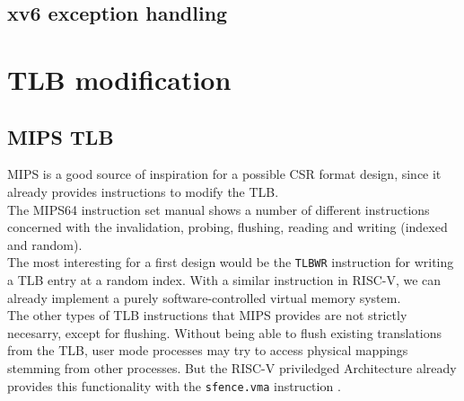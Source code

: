 \subsection{xv6 exception handling}

%
\section{TLB modification}

\subsection{MIPS TLB} %

MIPS is a good source of inspiration for a possible CSR format design, since it already provides
instructions to modify the TLB.\\
The MIPS64 instruction set manual \cite{MIPSArchitectureProgrammers2016}
shows a number of different instructions concerned with the invalidation, probing, flushing, reading
and writing (indexed and random).\\
The most interesting for a first design would be the \texttt{TLBWR} instruction for writing a TLB
entry at a random index. With a similar instruction in RISC-V, we can already implement a purely
software-controlled virtual memory system.\\
The other types of TLB instructions that MIPS provides are not strictly necesarry,
except for flushing. Without being able to flush existing translations from the TLB,
user mode processes may try to access physical mappings stemming from other processes.
But the RISC-V priviledged Architecture already provides this functionality
with the \texttt{sfence.vma} instruction \cite{riscvreader}.

